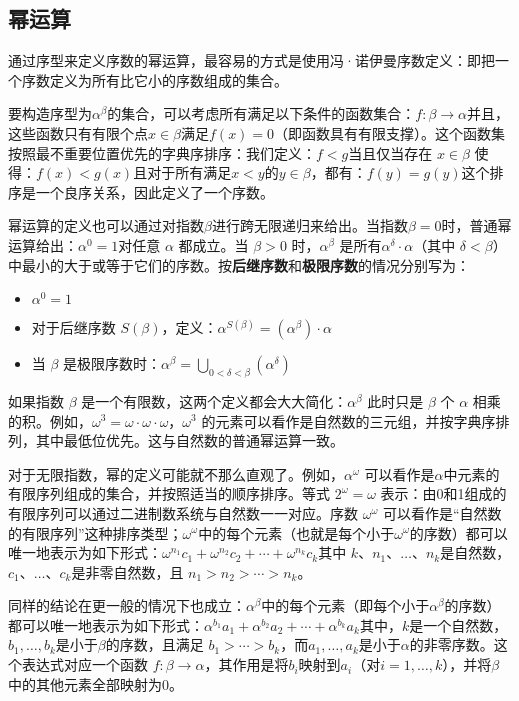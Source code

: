 \subsection{幂运算}
通过序型来定义序数的幂运算，最容易的方式是使用冯·诺伊曼序数定义：即把一个序数定义为所有比它小的序数组成的集合。

要构造序型为\(\alpha^\beta\)的集合，可以考虑所有满足以下条件的函数集合：\(f :\beta\to\alpha\)并且，这些函数只有有限个点\(x\in\beta\)满足\(f(x)=0\)（即函数具有有限支撑）。这个函数集按照最不重要位置优先的字典序排序：我们定义：\(f<g\)当且仅当存在 \(x \in \beta\) 使得：\(f(x)<g(x)\)且对于所有满足\(x < y\)的\(y\in\beta\)，都有：\(f(y) = g(y)\)这个排序是一个良序关系，因此定义了一个序数。

幂运算的定义也可以通过对指数\(\beta\)进行跨无限递归来给出。当指数\(\beta = 0\)时，普通幂运算给出：\(\alpha^0 = 1\)对任意 \(\alpha\) 都成立。当 \(\beta > 0\) 时，\(\alpha^\beta\) 是所有\(\alpha^\delta \cdot \alpha\)（其中 \(\delta < \beta\)）中最小的大于或等于它们的序数。按\textbf{后继序数}和\textbf{极限序数}的情况分别写为：
\begin{itemize}
\item \(\alpha^0=1~\)
\item 对于后继序数 \(S(\beta)\)，定义：\(\alpha^{S(\beta)} = (\alpha^\beta) \cdot \alpha~\)
\item 当 \(\beta\) 是极限序数时：\(\alpha^\beta = \bigcup_{0 < \delta < \beta} (\alpha^\delta)\)
\end{itemize}
如果指数 \(\beta\) 是一个有限数，这两个定义都会大大简化：\(\alpha^\beta\) 此时只是 \(\beta\) 个 \(\alpha\) 相乘的积。例如，\(\omega^3 = \omega \cdot \omega \cdot \omega\)，\(\omega^3\) 的元素可以看作是自然数的三元组，并按字典序排列，其中最低位优先。这与自然数的普通幂运算一致。

对于无限指数，幂的定义可能就不那么直观了。例如，\(\alpha^\omega\) 可以看作是\(\alpha\)中元素的有限序列组成的集合，并按照适当的顺序排序。等式 \(2^\omega = \omega\) 表示：由0和1组成的有限序列可以通过二进制数系统与自然数一一对应。序数 \(\omega^\omega\) 可以看作是“自然数的有限序列”这种排序类型；\(\omega^\omega\)中的每个元素（也就是每个小于\(\omega^\omega\)的序数）都可以唯一地表示为如下形式：\(\omega^{n_1}c_1+\omega^{n_2}c_2+\cdots+ \omega^{n_k}c_k\)其中 \(k\)、\(n_1\)、\(\dots\)、\(n_k\)是自然数，\(c_1\)、\(\dots\)、\(c_k\)是非零自然数，且 \(n_1 > n_2 > \cdots > n_k\)。

同样的结论在更一般的情况下也成立：\(\alpha^\beta\)中的每个元素（即每个小于\(\alpha^\beta\)的序数）都可以唯一地表示为如下形式：\(\alpha^{b_1}a_1 + \alpha^{b_2}a_2 + \cdots + \alpha^{b_k}a_k\)其中，\(k\)是一个自然数，\(b_1,\dots, b_k\)是小于\(\beta\)的序数，且满足 \(b_1 > \cdots > b_k\)，而\(a_1,\dots, a_k\)是小于\(\alpha\)的非零序数。这个表达式对应一个函数 \(f : \beta \to \alpha\)，其作用是将\(b_i\)映射到\(a_i\)（对\(i = 1,\dots, k\)），并将\(\beta\)中的其他元素全部映射为0。

